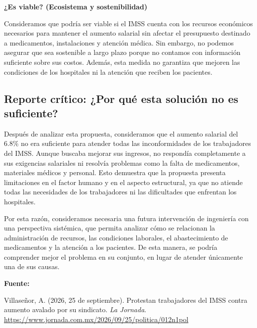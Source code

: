 \documentclass[12pt,letterpaper]{article}
\begin{document}
\textbf{¿Es viable? (Ecosistema y sostenibilidad)}

Consideramos que podría ser viable si el IMSS cuenta con los recursos económicos necesarios para mantener el aumento salarial sin afectar el presupuesto destinado a medicamentos, instalaciones y atención médica. Sin embargo, no podemos asegurar que sea sostenible a largo plazo porque no contamos con información suficiente sobre sus costos. Además, esta medida no garantiza que mejoren las condiciones de los hospitales ni la atención que reciben los pacientes.

\subsection*{Reporte crítico: ¿Por qué esta solución no es suficiente?}

Después de analizar esta propuesta, consideramos que el aumento salarial del 6.8\% no era suficiente para atender todas las inconformidades de los trabajadores del IMSS. Aunque buscaba mejorar sus ingresos, no respondía completamente a sus exigencias salariales ni resolvía problemas como la falta de medicamentos, materiales médicos y personal. Esto demuestra que la propuesta presenta limitaciones en el factor humano y en el aspecto estructural, ya que no atiende todas las necesidades de los trabajadores ni las dificultades que enfrentan los hospitales.

Por esta razón, consideramos necesaria una futura intervención de ingeniería con una perspectiva sistémica, que permita analizar cómo se relacionan la administración de recursos, las condiciones laborales, el abastecimiento de medicamentos y la atención a los pacientes. De esta manera, se podría comprender mejor el problema en su conjunto, en lugar de atender únicamente una de sus causas.

\textbf{Fuente:}

Villaseñor, A. (2026, 25 de septiembre). Protestan trabajadores del IMSS contra aumento avalado por su sindicato. \textit{La Jornada}. \url{https://www.jornada.com.mx/2026/09/25/politica/012n1pol}

\nocite{*}


\end{document}
